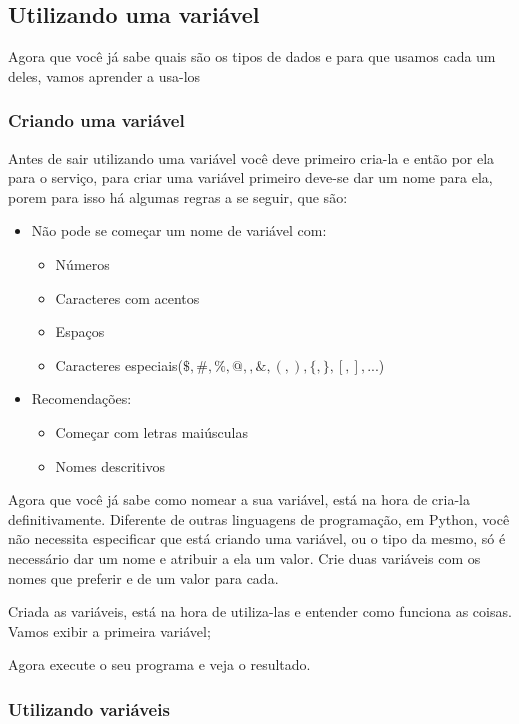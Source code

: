 \subsection{Utilizando uma variável}
Agora que você já sabe quais são os tipos de dados e para que usamos cada um deles, vamos aprender a usa-los
\subsubsection{Criando uma variável}
Antes de sair utilizando uma variável você deve primeiro cria-la e então por ela para o serviço, para criar uma variável primeiro deve-se dar um nome para ela, porem para isso há algumas regras a se seguir, que são:
\begin{itemize}
\item Não pode se começar um nome de variável com:

	\begin{itemize}
	\item Números
	\item Caracteres com acentos
	\item Espaços
	\item Caracteres especiais($\$,\#,\%,@,\!,\&,(,),\{,\},[,],...$)
	\end{itemize}

\item Recomendações:
	\begin{itemize}
	\item Começar com letras maiúsculas
	\item Nomes descritivos
	\end{itemize}
\end{itemize}

Agora que você já sabe como nomear a sua variável, está na hora de cria-la definitivamente. Diferente de outras linguagens de programação, em Python, você não necessita especificar que está criando uma variável, ou o tipo da mesmo, só é necessário dar um nome e atribuir a ela um valor. Crie duas variáveis com os nomes que preferir e de um valor para cada.

Criada as variáveis, está na hora de utiliza-las e entender como funciona as coisas. Vamos exibir a primeira variável;

Agora execute o seu programa e veja o resultado.

\subsubsection{Utilizando variáveis}
 

